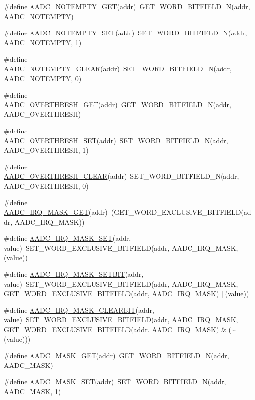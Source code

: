 \begin{DoxyCompactItemize}
\item 
\#define \hyperlink{a00542_a49a40d61cabc854b31b077afcc2be4d7}{AADC\_\-NOTEMPTY\_\-GET}(addr)~GET\_\-WORD\_\-BITFIELD\_\-N(addr, AADC\_\-NOTEMPTY)
\item 
\#define \hyperlink{a00542_a215302e1aac5723545cc4fb7be8c79dc}{AADC\_\-NOTEMPTY\_\-SET}(addr)~SET\_\-WORD\_\-BITFIELD\_\-N(addr, AADC\_\-NOTEMPTY, 1)
\item 
\#define \hyperlink{a00542_a195a618898615fcfec1feb1f71dec889}{AADC\_\-NOTEMPTY\_\-CLEAR}(addr)~SET\_\-WORD\_\-BITFIELD\_\-N(addr, AADC\_\-NOTEMPTY, 0)
\item 
\#define \hyperlink{a00542_a2cd6ca65a43019bb1f38ba95a5fd6f67}{AADC\_\-OVERTHRESH\_\-GET}(addr)~GET\_\-WORD\_\-BITFIELD\_\-N(addr, AADC\_\-OVERTHRESH)
\item 
\#define \hyperlink{a00542_a69e80a40fb8c2cbf66892bf8e3a7dfd4}{AADC\_\-OVERTHRESH\_\-SET}(addr)~SET\_\-WORD\_\-BITFIELD\_\-N(addr, AADC\_\-OVERTHRESH, 1)
\item 
\#define \hyperlink{a00542_ac02050b4ea0626510c5542bfd87ae2a9}{AADC\_\-OVERTHRESH\_\-CLEAR}(addr)~SET\_\-WORD\_\-BITFIELD\_\-N(addr, AADC\_\-OVERTHRESH, 0)
\item 
\#define \hyperlink{a00542_aced4f950ddac37f20b075861025d8e12}{AADC\_\-IRQ\_\-MASK\_\-GET}(addr)~(GET\_\-WORD\_\-EXCLUSIVE\_\-BITFIELD(addr, AADC\_\-IRQ\_\-MASK))
\item 
\#define \hyperlink{a00542_ad769f45089d4a17d096869acb4dd3ce5}{AADC\_\-IRQ\_\-MASK\_\-SET}(addr, value)~SET\_\-WORD\_\-EXCLUSIVE\_\-BITFIELD(addr, AADC\_\-IRQ\_\-MASK, (value))
\item 
\#define \hyperlink{a00542_a3a0a84ecfd296be922faa700c78fce60}{AADC\_\-IRQ\_\-MASK\_\-SETBIT}(addr, value)~SET\_\-WORD\_\-EXCLUSIVE\_\-BITFIELD(addr, AADC\_\-IRQ\_\-MASK, GET\_\-WORD\_\-EXCLUSIVE\_\-BITFIELD(addr, AADC\_\-IRQ\_\-MASK) $|$ (value))
\item 
\#define \hyperlink{a00542_a8897c4b18b498033b8883a82519d095b}{AADC\_\-IRQ\_\-MASK\_\-CLEARBIT}(addr, value)~SET\_\-WORD\_\-EXCLUSIVE\_\-BITFIELD(addr, AADC\_\-IRQ\_\-MASK, GET\_\-WORD\_\-EXCLUSIVE\_\-BITFIELD(addr, AADC\_\-IRQ\_\-MASK) \& ($\sim$(value)))
\item 
\#define \hyperlink{a00542_a9efc910ad7767331d25bf2418cd908d5}{AADC\_\-MASK\_\-GET}(addr)~GET\_\-WORD\_\-BITFIELD\_\-N(addr, AADC\_\-MASK)
\item 
\#define \hyperlink{a00542_a61e6e0a8a732e9c8f7002130418891dd}{AADC\_\-MASK\_\-SET}(addr)~SET\_\-WORD\_\-BITFIELD\_\-N(addr, AADC\_\-MASK, 1)
\item 

\end{DoxyCompactItemize}
